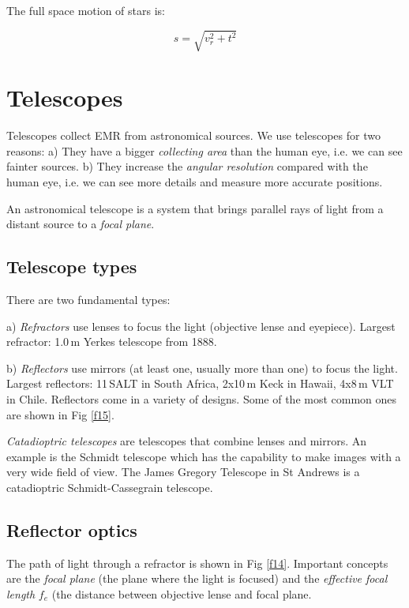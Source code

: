 The full space motion of stars is:

\begin{equation}
s = \sqrt{v_r^2 + t^2}
\label{eq24}
\end{equation}

\section{Telescopes}

Telescopes collect EMR from astronomical sources. We use telescopes for two reasons: a) They have a bigger \textit{collecting area} than the human eye, i.e. we can see fainter sources. b) They increase the \textit{angular resolution} compared with the human eye, i.e. we can see more details and measure more accurate positions.

An astronomical telescope is a system that brings parallel rays of light from a distant source to a \textit{focal plane}.

\subsection{Telescope types}

There are two fundamental types:

a) \textit{Refractors} use lenses to focus the light (objective lense and eyepiece). Largest refractor: 1.0\,m Yerkes telescope from 1888. 

b) \textit{Reflectors} use mirrors (at least one, usually more than one) to focus the light. Largest reflectors: 
11\,SALT in South Africa, 2x10\,m Keck in Hawaii, 4x8\,m VLT in Chile. Reflectors come in a variety of designs. Some of the most common ones are shown in Fig \ref{f15}.

\textit{Catadioptric telescopes} are telescopes that combine lenses and mirrors. An example is the Schmidt telescope which has the capability to make images with a very wide field of view. The James Gregory Telescope in St Andrews is a catadioptric Schmidt-Cassegrain telescope.

\subsection{Reflector optics}

The path of light through a refractor is shown in Fig \ref{f14}. Important concepts are the \textit{focal plane} (the plane where the light is focused) and the \textit{effective focal length} $f_e$ (the distance between objective lense and focal plane.

